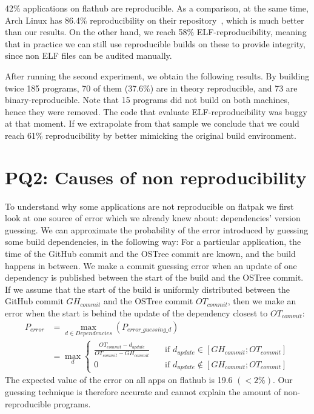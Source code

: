 \documentclass[a4paper,11pt,oneside]{report}
\theoremstyle{definition}
\newcommand{\rb}{reproducible builds\xspace}
\newcommand{\fp}{flatpak\xspace}
\newcommand{\fh}{flathub\xspace}
\newcommand{\ot}{OSTree\xspace}
\begin{document}
42\% applications on \fh are reproducible. As a comparison, at the same time,
Arch Linux has 86.4\% reproducibility on their
repository~\cite{arch-rebuilderd}, which is much better than our results. On
the other hand, we reach 58\% ELF-reproducibility, meaning that in practice we
can still use \rb on these to provide integrity, since non ELF files can be
audited manually.

\label{sec:theo-repro}
After running the second experiment, we obtain the following results. By
building twice 185 programs, 70 of them (37.6\%) are in theory reproducible,
and 73 are binary-reproducible. Note that 15 programs did not build on both
machines, hence they were removed. The code that evaluate ELF-reproducibility
was buggy at that moment. If we extrapolate from that sample we conclude that
we could reach 61\% reproducibility by better mimicking the original build
environment.


\section{PQ2: Causes of non reproducibility}
\label{sec:pq2}

To understand why some applications are not reproducible on \fp we first look
at one source of error which we already knew about: dependencies' version
guessing. We can approximate the probability of the error introduced by
guessing some build dependencies, in the following way: For a particular
application, the time of the GitHub commit and the \ot commit are known, and the
build happens in between. We make a commit guessing error when an update of one
dependency is published between the start of the build and the \ot commit. If
we assume that the start of the build is uniformly distributed between the
GitHub commit $GH_{commit}$ and the \ot commit $OT_{commit}$, then we make an
error when the start is behind the update of the dependency closest to
$OT_{commit}$:
\begin{align*}
    P_{error} &= \max_{d \in Dependencies}(P_{error\_guessing\_d}) \\
              &= \max_{d}
              \begin{cases}
                \frac{OT_{commit} - d_{update}}{OT_{commit} -
                    GH_{commit}}  & \quad \text{if } d_{update}
                    \in [GH_{commit}; OT_{commit}] \\
                0  & \quad \text{if } d_{update}
                  \notin [GH_{commit}; OT_{commit}]
              \end{cases}
\end{align*}
The expected value of the error on all apps on \fh is 19.6 $(< 2\%)$. Our guessing
technique is therefore accurate and cannot explain the amount of
non-reproducible programs.
\end{document}
